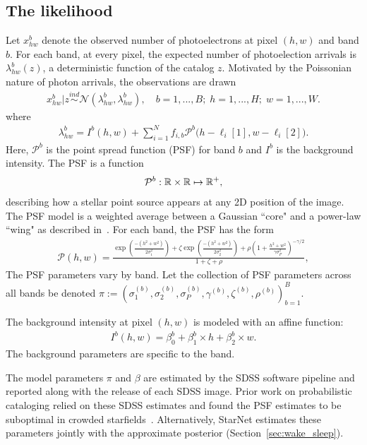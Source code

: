 \subsection{The likelihood}
Let $x_{hw}^b$ denote the observed number of photoelectrons at pixel $(h,w)$ and band $b$. For each band, at every pixel, the expected number of photoelection arrivals is $\lambda^b_{hw}(z)$, a deterministic function of the catalog $z$. Motivated by the Poissonian nature of photon arrivals, the observations are drawn
\begin{align}
  x_{hw}^b | z \overset{ind}{\sim} \mathcal{N}(\lambda^b_{hw}, \lambda^b_{hw}),
  \quad 
  b = 1, ..., B; \;
  h = 1,..., H; \; 
  w = 1, ..., W. 
\end{align}
where 
\begin{align}
  \lambda^b_{hw} = I^{b}(h, w) + \sum_{i = 1}^N f_{i,b} \mathcal{P}^b\big(h - \ell_{i}[1], w - \ell_{i}[2]\big).
  \label{eq:expected_intensity}
\end{align}
Here, $\mathcal{P}^b$ is the point spread function (PSF) for band $b$ and $I^{b}$ is the background intensity. The PSF is a function 
\begin{align}
\mathcal{P}^b : \mathbb{R} \times \mathbb{R} \mapsto \mathbb{R}^+,
\end{align}
describing how a stellar point source appears at any 2D position of the image. The PSF model is a weighted average between a Gaussian ``core" and a power-law ``wing" as described in~\cite{Xin2018psf}. For each band, the PSF has the form
\begin{align}
    \mathcal{P}(h, w) = \frac{\exp(\frac{-(h^2 + w^2)}{2\sigma_1^2}) + 
                            \zeta \exp(\frac{-(h^2 + w^2)}{2\sigma_2^2}) + 
                            \rho(1 + \frac{h^2 + w^2}{\gamma\sigma^2_P})^{-\gamma/2} }{1 + \zeta + \rho},
\end{align}
The PSF parameters vary by band. Let the collection of PSF parameters across all bands be denoted $\pi := (\sigma_{1}^{(b)}, \sigma_{2}^{(b)}, \sigma_{P}^{(b)}, \gamma^{(b)}, \zeta^{(b)}, \rho^{(b)})_{b=1}^B$.

The background intensity at pixel $(h,w)$ is modeled with an affine function: 
\begin{align}
    I^{b}(h,w) = \beta_0^{b} + \beta_1^{b} \times h + \beta_2^{b} \times w.
\end{align}
The background parameters are specific to the band. 

The model parameters $\pi$ and $\beta$ are estimated by the SDSS software pipeline and reported along with the release of each SDSS image.
Prior work on probabilistic cataloging relied 
on these SDSS estimates and found the PSF estimates to be suboptimal in crowded starfields~\cite{Feder_2019}. 
Alternatively, StarNet estimates these parameters jointly with the approximate posterior (Section~\ref{sec:wake_sleep}). 

